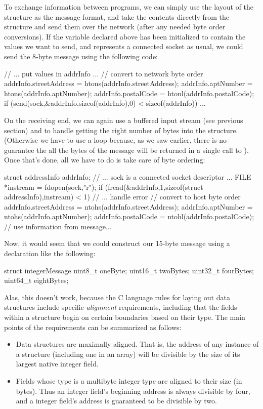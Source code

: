 To exchange information between programs, we can simply use the layout
of the structure as the message format, and take the contents directly
from the structure and send them over the network (after any needed
byte order conversions).
%
If the variable  declared above has been initialized to
contain the values we want to send,
and  represents a connected socket as usual, we could send the
8-byte message using the following code:
%
\begin{inlinecode}
  // ... put values in addrInfo ...
  // convert to network byte order
  addrInfo.streetAddress = htons(addrInfo.streetAddress);
  addrInfo.aptNumber = htons(addrInfo.aptNumber);
  addrInfo.postalCode = htonl(addrInfo.postalCode);
  if (send(sock,&addrInfo,sizeof(addrInfo),0) < sizeof(addrInfo)) ...
\end{inlinecode}
%
On the receiving end, we can again use a buffered input stream (see
previous section) and  to handle getting
the right number of bytes into the structure.  (Otherwise we have to
use a loop because, as we saw earlier,
there is no guarantee the all the bytes of
the message will be returned in a single call to ).
Once that's done, all we have to do is take care of byte ordering:
\begin{inlinecode}
  struct addressInfo addrInfo;
  // ... sock is a connected socket descriptor ...
  FILE *instream = fdopen(sock,"r");
  if (fread(&addrInfo,1,sizeof(struct addressInfo),instream) < 1) {
    // ... handle error
  }
  // convert to host byte order
  addrInfo.streetAddress = ntohs(addrInfo.streetAddress);
  addrInfo.aptNumber = ntohs(addrInfo.aptNumber);
  addrInfo.postalCode = ntohl(addrInfo.postalCode);
  // use information from message...
\end{inlinecode}
%
%
Now, it would seem that we could construct our 15-byte
message using a declaration like the following:
%
\begin{inlinecode}
  struct integerMessage {
    uint8_t oneByte;
    uint16_t twoBytes;
    uint32_t fourBytes;
    uint64_t eightBytes;
  } 
\end{inlinecode}
%
Alas, this doesn't work, because the C language
rules for laying out data structures
include specific \emph{alignment\/} requirements, including that the
fields within a structure begin on certain boundaries based on their type.
The main points of the requirements can be summarized as follows:
\begin{itemize}
\item
Data structures are maximally aligned.  That is, the address of any
instance of a structure (including one in an array) will be divisible
by the size of its largest native integer field.
\item
Fields whose type is a multibyte integer type are aligned to their
size (in bytes).
Thus an  integer field's beginning address is always
divisible by four, and a 
integer field's address is guaranteed to be divisible by two.
\end{itemize}
